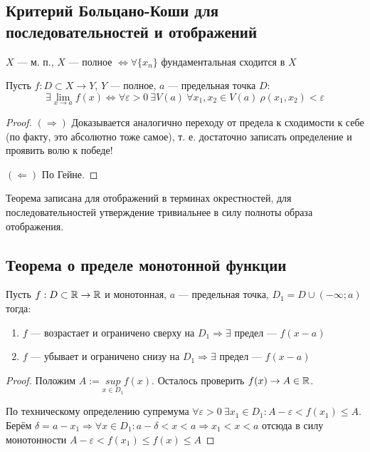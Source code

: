 \newpage
{}
\subsection{Критерий Больцано-Коши для последовательностей и отображений}
\begin{definition}
$X$ {---} м. п., $X$ {---} полное $\Leftrightarrow \forall \{x_n\}$ фундаментальная сходится в $X$ 
\end{definition}
\begin{theorem*}
Пусть $f: D \subset X \rightarrow Y$, $Y$ {---} полное, $a$ {---} предельная точка $D$:
$$\exists \lim_{x \to a}{f(x)} \Leftrightarrow \forall \varepsilon > 0 \ \exists V(a) \ \forall x_1, x_2 \in V(a) \ \rho(x_1, x_2) < \varepsilon$$
\end{theorem*}
\begin{proof}
$(\Rightarrow)$ Доказывается аналогично переходу от предела к сходимости к себе (по факту, это абсолютно тоже самое), т. е. достаточно записать определение и проявить волю к победе!
  
$(\Leftarrow)$ По Гейне.
\end{proof}
\begin{remark}
Теорема записана для отображений в терминах окрестностей, для последовательностей утверждение тривиальнее в силу полноты образа отображения.
\end{remark}

\newpage
\subsection{Теорема о пределе монотонной функции}
\begin{theorem}
Пусть $f: D \subset \operatorname*{\mathbb{R}} \to \operatorname*{\mathbb{R}}$ и монотонная, $a$ {---} предельная точка, $D_1 = D \cup (-\infty; a)$ тогда:
\begin{enumerate}
    \item $f$ {---} возрастает и ограничено сверху на $D_1 \Rightarrow \exists$ предел {---} $f(x - a)$
    \item $f$ {---} убывает и ограничено снизу на $D_1 \Rightarrow \exists$ предел {---} $f(x - a)$
\end{enumerate}
\end{theorem}
\begin{proof}
Положим $A := \underset{x \in D_1}{sup}f(x)$. Осталось проверить $f(x) \to A \in \operatorname*{\mathbb{R}}$.
  
По техническому определению супремума $\forall \varepsilon > 0 \ \exists x_1 \in D_1: A - \varepsilon < f(x_1) \leq A$. Берём $\delta = a - x_1 \Rightarrow \forall x \in D_1: a - \delta < x < a \Rightarrow x_1 < x < a$ отсюда в силу монотонности $A - \varepsilon < f(x_1) \leq f(x) \leq A$
\end{proof}

